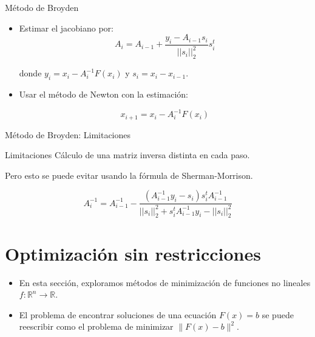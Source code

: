 \documentclass[a4paper,10pt]{beamer}
\begin{document}
\begin{frame}{Método de Broyden}
	\begin{itemize}
		\item Estimar el jacobiano por:
	\begin{equation}\label{SM}
		A_i = A_{i-1} + \frac{y_i-A_{i-1} s_i}{||s_i||^2_2}s^t_i
	\end{equation}
	
	donde $y_i = x_i-A_i^{-1}F(x_{i})$ y $s_i = x_{i} - x_{i-1}$.

		\item Usar el método de Newton con la estimación:
		
	\[x_{i+1} = x_{i}-A_i^{-1} F(x_{i})\]
	
\end{itemize}
\end{frame}

\begin{frame}{Método de Broyden: Limitaciones}

	\begin{block}{Limitaciones}
	Cálculo de una matriz inversa distinta en cada paso.
	\end{block}
	\pause

	Pero esto se puede evitar usando la fórmula de Sherman-Morrison.
	
\[A^{-1}_i = A_{i-1}^{-1} - \frac{(	A_{i-1}^{-1} y_{i} - s_{i}) s_{i}^{t} 	A_{i-1}^{-1}  }{ ||s_{i}||_2^2 + s_{i}^{t} A_{i-1}^{-1} y_{i} - ||s_{i}||_2^2 } \]
\end{frame}

\section{Optimización sin restricciones}

\begin{frame}
	\begin{itemize}
		\item En esta sección, exploramos métodos de minimización de funciones no lineales $f : \mathbb{R}^n\to\mathbb{R}$.
		\pause
		\item El problema de encontrar soluciones de una ecuación $F(x)=b$ se puede reescribir como el problema de minimizar $\|F(x)-b\|^2$.
	\end{itemize}
\end{frame}
\end{document}
